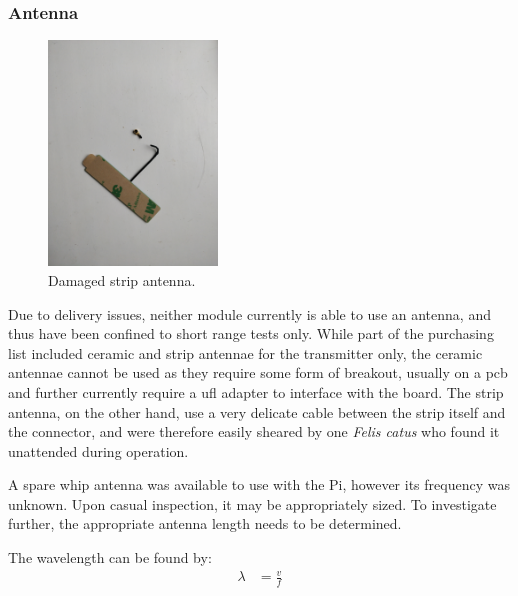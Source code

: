 \subsubsection{Antenna}

\begin{figure}
    \centering
    \includegraphics[width=0.4\textwidth]{../figures/damaged antenna.jpg}
    \caption{Damaged strip antenna.}
    \label{fig:damagedantenna}
\end{figure}

Due to delivery issues, neither module currently is able to use an antenna, and thus have
been confined to short range tests only.
While part of the purchasing list included ceramic and strip antennae for the
transmitter only, the ceramic antennae cannot be used as they require some form of breakout,
usually on a \acrshort{pcb} and further currently require a \gls{ufl} adapter to interface
with the board. The strip antenna, on the other hand, use a very delicate cable between the strip itself and
the connector, and were therefore easily sheared by one \textit{Felis catus} who found it
unattended during operation.


A spare whip antenna was available to use with the Pi, however its frequency was
unknown. Upon casual inspection, it may be appropriately sized. To investigate further,
the appropriate antenna length needs to be determined.

The wavelength can be found by:
\begin{align*}
    \lambda & = \frac{v}{f}
\end{align*}

